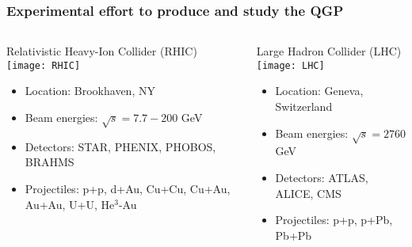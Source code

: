 \documentclass[svgnames]{beamer}
\begin{document}
\begin{frame}
\frametitle{Experimental effort to produce and study the QGP}

\begin{columns}[T]
 \begin{column}{0.5\textwidth}
  \centering
  {\small Relativistic Heavy-Ion Collider (RHIC)} \vspace{0.1 in}
  \texttt{[image: RHIC]}
  \vspace{-0.2 in}
  \footnotesize
  \begin{itemize}
   \item Location: Brookhaven, NY
   \item Beam energies: $\sqrt{s} = 7.7 - 200$ GeV
   \item Detectors: STAR, PHENIX, PHOBOS, BRAHMS
   \item Projectiles: p+p, d+Au, Cu+Cu, Cu+Au, Au+Au, U+U, He$^3$-Au
  \end{itemize}
 \end{column}
 
 \vline \hspace{0.1 in}
 
 \begin{column}{0.5\textwidth}
  \centering
  {\small Large Hadron Collider (LHC)} \vspace{0.05 in}
  \texttt{[image: LHC]}
  \vspace{0.05 in}
  \footnotesize
  \begin{itemize}
   \item Location: Geneva, Switzerland
   \item Beam energies: $\sqrt{s} = 2760$ GeV
   \item Detectors: ATLAS, ALICE, CMS
   \item Projectiles: p+p, p+Pb, Pb+Pb
  \end{itemize}
 \end{column}
 
\end{columns}
 
\end{frame}
\end{document}

